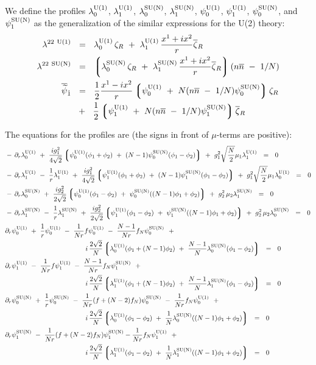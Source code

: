 \documentclass{article}
\newcommand{\p}{\partial}
\newcommand{\wt}{\widetilde}
\newcommand{\ov}{\overline}
\newcommand{\lgr}{\left\lgroup}
\newcommand{\rgr}{\right\rgroup}
\newcommand{\nbar}{\ov{n}}
\begin{document}
We define the profiles $ \lambda_0^{\rm U(1)} $, $ \lambda_1^{\rm U(1)} $, $ \lambda_0^{\rm SU(N)} $, $ \lambda_1^{\rm SU(N)} $, $ \psi_0^{\rm U(1)} $, $ \psi_1^{\rm U(1)} $, $ \psi_0^{\rm SU(N)} $, and $ \psi_1^{\rm SU(N)} $ 
as the generalization of the similar expressions for the U(2) theory:
\begin{align*}
%
	\lambda^{22\ \rm U(1)} & ~~=~~ \loU\, \zeta_R ~+~ \llU\, \frac{x^1 + i x^2}{r} \ov{\zeta}{}_R 
	\\
%
	\lambda^{22\ \rm SU(N)} & ~~=~~ \lgr  \loN\, \zeta_R ~+~ \llN\, \frac{x^1 + i x^2}{r} \ov{\zeta}{}_R \rgr
					( n\nbar ~-~ 1/N )
	\\
%
	\ov{\wt{\psi}}{}_{\dot{1}} & ~~=~~ \frac{1}{2} \frac{x^1 - i x^2}{r}
				\lgr  \poU ~+~ N (n\nbar ~-~ 1/N) \poN \rgr \zeta_R \\
				   & 
				~~+~~ \frac{1}{2} \lgr  \plU  ~+~ N (n\nbar ~-~ 1/N) \plN \rgr  \ov{\zeta}{}_R
\end{align*}

The equations for the profiles are (the signs in front of $\mu$-terms are positive):
\begin{align}
%
\notag
&
	-\, \p_r \loU ~+~ \frac{i g_1^2}{4\sqrt{2}} 
			\lgr \poU (\phi_1 + \phi_2) ~+~ (N-1) \poN (\phi_1 - \phi_2) \rgr 
				~+~ g_1^2 \sqrt{\frac{N}{2}} \mu_1 \llU    ~~=~~ 0
	\\
%
\notag
&
	-\, \p_r \llU ~-~ \frac{1}{r}\llU 
	~+~ \frac{i g_1^2}{4\sqrt{2}} 
	    \lgr \plU (\phi_1 + \phi_2) ~+~ (N-1) \plN (\phi_1 - \phi_2) \rgr 
	~+~ g_1^2 \sqrt{\frac{N}{2}} \mu_1 \loU ~~=~~ 0
	\\
%
\notag
&
	-\, \p_r \loN ~+~ 
	\frac{i g_2^2}{2\sqrt{2}}
		\lgr \poU (\phi_1 - \phi_2) ~+~ \poN ( (N-1) \phi_1 + \phi_2 ) \rgr 
	~+~ g_2^2\, \mu_2 \llN ~~=~~ 0
	\\
%
\notag
&
	-\, \p_r \llN ~-~ \frac{1}{r}\llN
	~+~ \frac{i g_2^2}{2\sqrt{2}} 
		\lgr \plU (\phi_1 - \phi_2) ~+~ \plN ( (N-1) \phi_1 + \phi_2 ) \rgr
	~+~ g_2^2\, \mu_2 \loN ~~=~~ 0
	\\
%
\notag
&
	\p_r \poU ~+~ \frac{1}{r} \poU ~-~ \frac{1}{Nr}f \poU ~-~ \frac{N-1}{Nr} f_N \poN 
	~~+~~  \\
&\notag
\qquad\qquad\qquad\qquad\qquad\qquad
	i\, \frac{2\sqrt{2}}{N} 
		\lgr  \loU (\phi_1 + (N-1)\phi_2) ~+~ \frac{N-1}{N} \loN (\phi_1 - \phi_2) \rgr 
		~~=~~ 0
	\\
%
&
\label{N1_strans_eqn}
	\p_r \plU ~-~ \frac{1}{Nr}f \plU ~-~ \frac{N-1}{Nr} f_N \plN 
	~~+~~ \\
&\notag
\qquad\qquad\qquad\qquad\qquad\qquad
	i\, \frac{2\sqrt{2}}{N}
		\lgr \llU (\phi_1 + (N-1) \phi_2) ~+~ \frac{N-1}{N} \llN (\phi_1 - \phi_2) \rgr
		~~=~~ 0
	\\
%
&
\notag
	\p_r \poN ~+~ \frac{1}{r} \poN ~-~ \frac{1}{Nr} (f + (N-2)f_N) \poN ~-~
			\frac{1}{Nr} f_N \poU 
	~~+~~ \\
&\notag
\qquad\qquad\qquad\qquad\qquad\qquad
	i\, \frac{2\sqrt{2}}{N} 
		\lgr \loU (\phi_1 - \phi_2) ~+~ \frac{1}{N} \loN ((N-1)\phi_1 + \phi_2) \rgr
		~~=~~ 0
	\\
%
&
\notag
	\p_r \plN ~-~ \frac{1}{Nr} (f + (N-2)f_N) \plN - \frac{1}{Nr} f_N \plU 
	~~+~~  \\
&\notag
\qquad\qquad\qquad\qquad\qquad\qquad
	i\, \frac{2\sqrt{2}}{N}
		\lgr \llU (\phi_1 - \phi_2) ~+~ \frac{1}{N} \llN ((N-1)\phi_1 + \phi_2) \rgr
		~~=~~ 0
\end{align}
\end{document}
